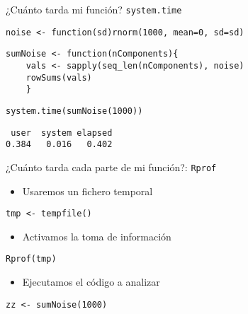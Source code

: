 \documentclass[xcolor={usenames,svgnames,dvipsnames}]{beamer}
\begin{document}
\begin{frame}[fragile,label=sec-3-5]{¿Cuánto tarda mi función? \texttt{system.time}}
 \lstset{language=R,numbers=none}
\begin{lstlisting}
noise <- function(sd)rnorm(1000, mean=0, sd=sd)
\end{lstlisting}

\lstset{language=R,numbers=none}
\begin{lstlisting}
sumNoise <- function(nComponents){
    vals <- sapply(seq_len(nComponents), noise)
    rowSums(vals)
    }
\end{lstlisting}

\lstset{language=R,numbers=none}
\begin{lstlisting}
system.time(sumNoise(1000))
\end{lstlisting}

\begin{verbatim}
 user  system elapsed 
0.384   0.016   0.402
\end{verbatim}
\end{frame}
\begin{frame}[fragile,label=sec-3-6]{¿Cuánto tarda cada parte de mi función?: \texttt{Rprof}}
 \begin{itemize}
\item Usaremos un fichero temporal
\end{itemize}
\lstset{language=R,numbers=none}
\begin{lstlisting}
tmp <- tempfile()
\end{lstlisting}

\begin{itemize}
\item Activamos la toma de información
\end{itemize}
\lstset{language=R,numbers=none}
\begin{lstlisting}
Rprof(tmp)
\end{lstlisting}

\begin{itemize}
\item Ejecutamos el código a analizar
\end{itemize}
\lstset{language=R,numbers=none}
\begin{lstlisting}
zz <- sumNoise(1000)
\end{lstlisting}
\end{frame}
\end{document}
